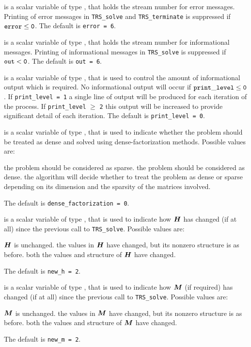 \documentclass{galahad}
\newcommand{\packagename}{TRS}
\begin{document}
\begin{description}
 is a scalar variable of type \integer, that holds the
stream number for error messages.
Printing of error messages in
{\tt \packagename\_solve} and {\tt \packagename\_terminate}
is suppressed if ${\tt error} \leq {\tt 0}$.
The default is {\tt error = 6}.

 is a scalar variable of type \integer, that holds the
stream number for informational messages.
Printing of informational messages in
{\tt \packagename\_solve} is suppressed if ${\tt out} < {\tt 0}$.
The default is {\tt out = 6}.

 is a scalar variable of type \integer,
that is used
to control the amount of informational output which is required. No
informational output will occur if ${\tt print\_level} \leq {\tt 0}$. If
{\tt print\_level = 1} a single line of output will be produced for each
iteration of the process. If {\tt print\_level} $\geq$ {\tt 2} this output
will be increased to provide significant detail of each iteration.
The default is {\tt print\_level = 0}.

 is a scalar variable of type \integer,
that is used to indicate whether the problem should be treated as dense
and solved using dense-factorization methods. Possible values are:
\begin{description}
 the problem should be considered as sparse.
 the problem should be considered as dense.
 the algorithm will decide whether to treat the
problem as dense or sparse depending on its dimension and the
sparsity of the matrices involved.
\end{description}
The default is {\tt dense\_factorization = 0}.

 is a scalar variable of type \integer, that is used
to indicate how ${\bm{H}}$ has changed (if at all) since the previous call
to {\tt \packagename\_solve}. Possible values are:
\begin{description}
 ${\bm{H}}$ is unchanged.
 the values in ${\bm{H}}$ have changed, but its nonzero structure
is as before.
 both the values and structure of ${\bm{H}}$ have changed.
\end{description}
The default is {\tt new\_h = 2}.

 is a scalar variable of type \integer, that is used
to indicate how ${\bm{M}}$ (if required) has changed (if at all) since the previous
call to {\tt \packagename\_solve}. Possible values are:
\begin{description}
 ${\bm{M}}$ is unchanged.
 the values in ${\bm{M}}$ have changed, but its nonzero structure
is as before.
 both the values and structure of ${\bm{M}}$ have changed.
\end{description}
The default is {\tt new\_m = 2}.


\end{description}
\end{document}
